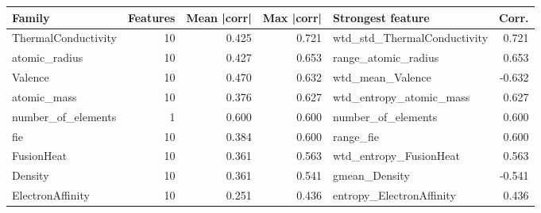 \begin{tabular}{lrrrlr}
\toprule
Family & Features & Mean |corr| & Max |corr| & Strongest feature & Corr. \\
\midrule
ThermalConductivity & 10 & 0.425 & 0.721 & wtd\_std\_ThermalConductivity & 0.721 \\
atomic\_radius & 10 & 0.427 & 0.653 & range\_atomic\_radius & 0.653 \\
Valence & 10 & 0.470 & 0.632 & wtd\_mean\_Valence & -0.632 \\
atomic\_mass & 10 & 0.376 & 0.627 & wtd\_entropy\_atomic\_mass & 0.627 \\
number\_of\_elements & 1 & 0.600 & 0.600 & number\_of\_elements & 0.600 \\
fie & 10 & 0.384 & 0.600 & range\_fie & 0.600 \\
FusionHeat & 10 & 0.361 & 0.563 & wtd\_entropy\_FusionHeat & 0.563 \\
Density & 10 & 0.361 & 0.541 & gmean\_Density & -0.541 \\
ElectronAffinity & 10 & 0.251 & 0.436 & entropy\_ElectronAffinity & 0.436 \\
\bottomrule
\end{tabular}

